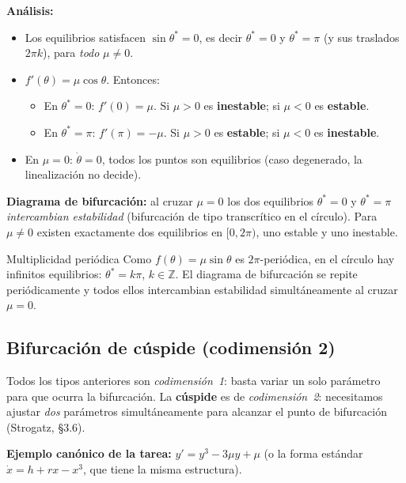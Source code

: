 \documentclass[11pt,letterpaper]{article}
\begin{document}
\textbf{Análisis:}
\begin{itemize}
  \item Los equilibrios satisfacen $\sin\theta^*=0$, es decir
        $\theta^*=0$ y $\theta^*=\pi$ (y sus traslados $2\pi k$), para \emph{todo} $\mu\neq 0$.
  \item $f'(\theta)=\mu\cos\theta$. Entonces:
        \begin{itemize}
            \item En $\theta^*=0$: $f'(0)=\mu$.
                  Si $\mu>0$ es \textbf{inestable}; si $\mu<0$ es \textbf{estable}.
            \item En $\theta^*=\pi$: $f'(\pi)=-\mu$.
                  Si $\mu>0$ es \textbf{estable}; si $\mu<0$ es \textbf{inestable}.
        \end{itemize}
  \item En $\mu=0$: $\dot\theta=0$, todos los puntos son equilibrios
        (caso degenerado, la linealización no decide).
\end{itemize}

\textbf{Diagrama de bifurcación:} al cruzar $\mu=0$ los dos equilibrios
$\theta^*=0$ y $\theta^*=\pi$ \emph{intercambian estabilidad}
(bifurcación de tipo transcrítico en el círculo).
Para $\mu\neq 0$ existen exactamente dos equilibrios en $[0,2\pi)$, uno
estable y uno inestable.

\begin{observacion}{Multiplicidad periódica}{}
Como $f(\theta)=\mu\sin\theta$ es $2\pi$-periódica, en el círculo
hay infinitos equilibrios: $\theta^*=k\pi$, $k\in\mathbb{Z}$.
El diagrama de bifurcación se repite periódicamente y todos ellos
intercambian estabilidad simultáneamente al cruzar $\mu=0$.
\end{observacion}

\subsection{Bifurcación de cúspide (codimensión 2)}

Todos los tipos anteriores son \emph{codimensión~1}: basta variar un solo
parámetro para que ocurra la bifurcación. La \textbf{cúspide} es de
\emph{codimensión~2}: necesitamos ajustar \emph{dos} parámetros simultáneamente
para alcanzar el punto de bifurcación (Strogatz, §3.6).

\textbf{Ejemplo canónico de la tarea:} $y'=y^3-3\mu y+\mu$ (o la forma
estándar $\dot x = h + rx - x^3$, que tiene la misma estructura).
\end{document}
